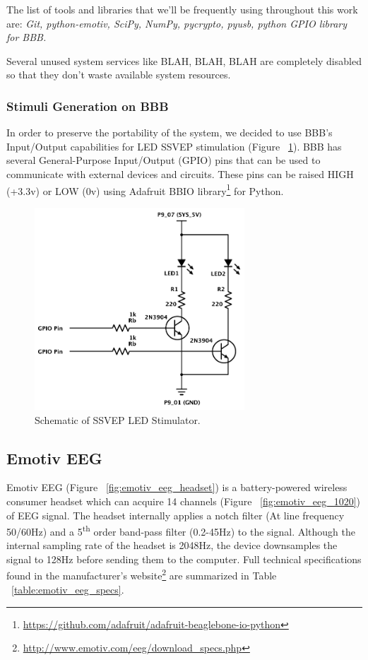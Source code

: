 \documentclass[12pt]{article}
\newcommand\mysubsection[1]{\subsection{#1}}
\newcommand\mysubsubsection[1]{\subsubsection{#1}}
\numberwithin{equation}{section}
\numberwithin{figure}{section}
\numberwithin{table}{section}
\begin{document}
\par{
The list of tools and libraries that we'll be frequently using throughout this work are: {\em Git, python-emotiv, SciPy, NumPy, pycrypto, pyusb, python GPIO library for BBB.}
}

\par{
Several unused system services like BLAH, BLAH, BLAH are completely disabled so that they don't waste available system resources.
}

\mysubsubsection{Stimuli Generation on BBB}\label{seq:embeddedcomputer_stimuligen}
\par{
}
\par{
    In order to preserve the portability of the system, we decided to use BBB's
    Input/Output capabilities for LED SSVEP stimulation (Figure ~\ref{fig:bbb_led_schema}).
    BBB has several General-Purpose Input/Output (GPIO) pins that can be used to communicate with external
    devices and circuits. These pins can be raised HIGH (+3.3v) or LOW (0v)
    using Adafruit BBIO library\footnote{\url{https://github.com/adafruit/adafruit-beaglebone-io-python}} for Python.
}

\begin{figure}[ht]
    \centering
    \includegraphics[width=0.7\textwidth]{images/led_circuit}
    \caption{Schematic of SSVEP LED Stimulator.}
    \label{fig:bbb_led_schema}
\end{figure}

\mysubsection{Emotiv EEG}\label{seq:emotiveeg}

\par{
    Emotiv EEG (Figure ~\ref{fig:emotiv_eeg_headset}) is a battery-powered wireless consumer headset which can
    acquire 14 channels (Figure ~\ref{fig:emotiv_eeg_1020}) of EEG signal. The headset internally applies a
    notch filter (At line frequency 50/60Hz) and a 5\textsuperscript{th} order band-pass filter (0.2-45Hz)
    to the signal. Although the internal sampling rate of the headset is 2048Hz, the device
    downsamples the signal to 128Hz before sending them to the computer. Full technical specifications found in the
    manufacturer's website\footnote{\url{http://www.emotiv.com/eeg/download_specs.php}} are summarized in Table ~\ref{table:emotiv_eeg_specs}.
}
\end{document}
